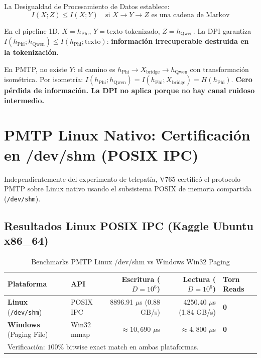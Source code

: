 La Desigualdad de Procesamiento de Datos establece:
\begin{equation}
  I(X; Z) \le I(X; Y) \quad \text{si } X \to Y \to Z \text{ es una cadena de Markov}
\end{equation}

En el pipeline 1D, $X = h_{\text{Phi}}$, $Y = \text{texto tokenizado}$, $Z = h_{\text{Qwen}}$.
La DPI garantiza $I(h_{\text{Phi}}; h_{\text{Qwen}}) \le I(h_{\text{Phi}}; \text{texto})$:
\textbf{información irrecuperable destruida en la tokenización}.

En PMTP, no existe $Y$: el camino es $h_{\text{Phi}} \to X_{\text{bridge}} \to h_{\text{Qwen}}$
con transformación isométrica. Por isometría: $I(h_{\text{Phi}}; h_{\text{Qwen}}) = I(h_{\text{Phi}}; X_{\text{bridge}}) = H(h_{\text{Phi}})$.
\textbf{Cero pérdida de información. La DPI no aplica porque no hay canal ruidoso intermedio.}

\section{PMTP Linux Nativo: Certificación en /dev/shm (POSIX IPC)}

Independientemente del experimento de telepatía, V765 certificó el protocolo PMTP
sobre Linux nativo usando el subsistema POSIX de memoria compartida (\texttt{/dev/shm}).

\subsection{Resultados Linux POSIX IPC (Kaggle Ubuntu x86\_64)}

\begin{table}[htbp]
\centering
\caption{Benchmarks PMTP Linux /dev/shm vs Windows Win32 Paging}
\label{tab:linux_pmtp}
\begin{tabular}{@{}llrrl@{}}
\toprule
Plataforma & API & Escritura ($D=10^6$) & Lectura ($D=10^6$) & Torn Reads \\
\midrule
\textbf{Linux} (\texttt{/dev/shm})    & POSIX IPC & 8896.91 $\mu$s (0.88 GB/s)  & 4250.40 $\mu$s (1.84 GB/s) & \textbf{0} \\
\textbf{Windows} (Paging File)        & Win32 mmap & $\approx 10{,}690$ $\mu$s   & $\approx 4{,}800$ $\mu$s   & \textbf{0} \\
\bottomrule
\multicolumn{5}{l}{\footnotesize Verificación: $100\%$ bitwise exact match en ambas plataformas.}
\end{tabular}
\end{table}

